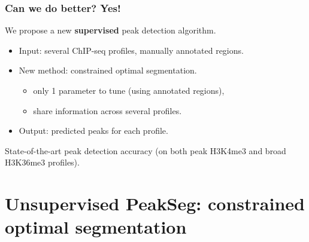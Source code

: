 \documentclass{beamer}
\DeclareMathOperator*{\Lik}{Lik}
\DeclareMathOperator*{\Segments}{Segments}
\DeclareMathOperator*{\argmax}{arg\,max}
\newcommand{\RR}{\mathbb R}
\newcommand{\ZZ}{\mathbb Z}
\begin{document}
\begin{frame}
  \frametitle{Can we do better? Yes!}
  We propose a new \textbf{supervised} peak detection
  algorithm.
  \begin{itemize}
  \item Input: several ChIP-seq profiles, manually annotated regions.
  \item New method: constrained optimal segmentation.
    \begin{itemize}
      \item only 1 parameter to tune (using annotated regions),
      \item share information across several profiles.
    \end{itemize}
  \item Output: predicted peaks for each profile.
  \end{itemize}
  State-of-the-art peak detection accuracy (on both peak H3K4me3 and
  broad H3K36me3 profiles).
\end{frame}

\section{Unsupervised PeakSeg: 
constrained optimal segmentation}

\end{document}

